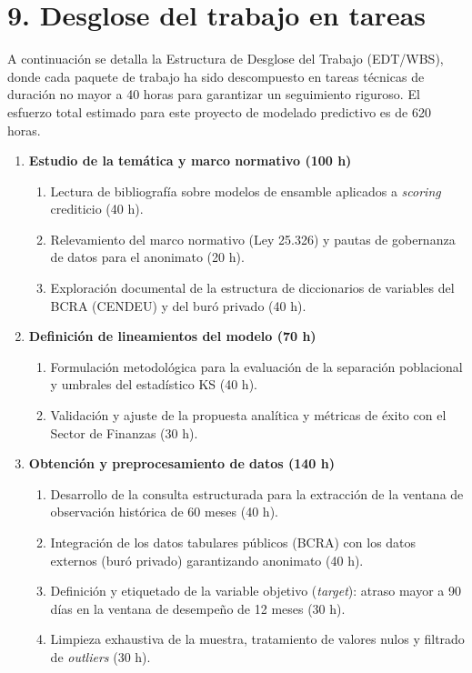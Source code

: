 \documentclass[
11pt, %
codirector, %
]{charter}
\begin{document}
\section{9. Desglose del trabajo en tareas}
\label{sec:wbs}

A continuación se detalla la Estructura de Desglose del Trabajo (EDT/WBS), donde cada paquete de trabajo ha sido descompuesto en tareas técnicas de duración no mayor a 40 horas para garantizar un seguimiento riguroso. El esfuerzo total estimado para este proyecto de modelado predictivo es de 620 horas.

\begin{enumerate}

    \item \textbf{Estudio de la temática y marco normativo (100 h)}
    \begin{enumerate}
        \item Lectura de bibliografía sobre modelos de ensamble aplicados a \textit{scoring} crediticio (40 h).
        \item Relevamiento del marco normativo (Ley 25.326) y pautas de gobernanza de datos para el anonimato (20 h).
        \item Exploración documental de la estructura de diccionarios de variables del BCRA (CENDEU) y del buró privado (40 h).
    \end{enumerate}

    \item \textbf{Definición de lineamientos del modelo (70 h)}
    \begin{enumerate}
        \item Formulación metodológica para la evaluación de la separación poblacional y umbrales del estadístico KS (40 h).
        \item Validación y ajuste de la propuesta analítica y métricas de éxito con el Sector de Finanzas (30 h).
    \end{enumerate}

    \item \textbf{Obtención y preprocesamiento de datos (140 h)}
    \begin{enumerate}
        \item Desarrollo de la consulta estructurada para la extracción de la ventana de observación histórica de 60 meses (40 h).
        \item Integración de los datos tabulares públicos (BCRA) con los datos externos (buró privado) garantizando anonimato (40 h).
        \item Definición y etiquetado de la variable objetivo (\textit{target}): atraso mayor a 90 días en la ventana de desempeño de 12 meses (30 h).
        \item Limpieza exhaustiva de la muestra, tratamiento de valores nulos y filtrado de \textit{outliers} (30 h).
    \end{enumerate}


\end{enumerate}
\end{document}
